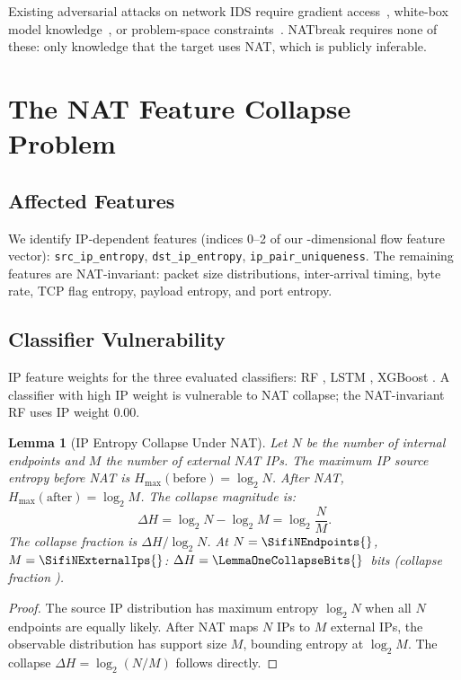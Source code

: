 \documentclass[conference]{IEEEtran}
\newtheorem{lemma}{Lemma}
\begin{document}
Existing adversarial attacks on network IDS require gradient access~\cite{Carlini2017},
white-box model knowledge~\cite{Goodfellow2014}, or
problem-space constraints~\cite{Biggio2013}.
NATbreak requires none of these: only knowledge that the target uses NAT,
which is publicly inferable.

\section{The NAT Feature Collapse Problem}
\label{sec:collapse}

\subsection{Affected Features}

We identify \NIPFeatures{} IP-dependent features (indices 0--2 of our
\NTotalFeatures{}-dimensional flow feature vector):
\texttt{src\_ip\_entropy}, \texttt{dst\_ip\_entropy},
\texttt{ip\_pair\_uniqueness}.
The remaining \NInvariantFeatures{} features are NAT-invariant: packet size
distributions, inter-arrival timing, byte rate, TCP flag entropy, payload
entropy, and port entropy.

\subsection{Classifier Vulnerability}

IP feature weights for the three evaluated classifiers:
RF \RfIpWeight{}, LSTM \LstmIpWeight{}, XGBoost \XgbIpWeight{}.
A classifier with high IP weight is vulnerable to NAT collapse;
the NAT-invariant RF uses IP weight 0.00.

\begin{lemma}[IP Entropy Collapse Under NAT]
\label{lem:collapse}
Let $N$ be the number of internal endpoints and $M$ the number of external
NAT IPs.
The maximum IP source entropy before NAT is $H_{\max}(\text{before}) = \log_2 N$.
After NAT, $H_{\max}(\text{after}) = \log_2 M$.
The collapse magnitude is:
\[
  \Delta H = \log_2 N - \log_2 M = \log_2 \frac{N}{M}.
\]
The collapse fraction is $\Delta H / \log_2 N$.
At $N = \SifiNEndpoints{}$, $M = \SifiNExternalIps{}$:
$\Delta H = \LemmaOneCollapseBits{}$~bits
(collapse fraction \LemmaOneCollapseFrac{}).
\end{lemma}

\begin{proof}
The source IP distribution has maximum entropy $\log_2 N$ when all $N$
endpoints are equally likely.
After NAT maps $N$ IPs to $M$ external IPs, the observable distribution
has support size $M$, bounding entropy at $\log_2 M$.
The collapse $\Delta H = \log_2(N/M)$ follows directly.
\end{proof}
\end{document}
